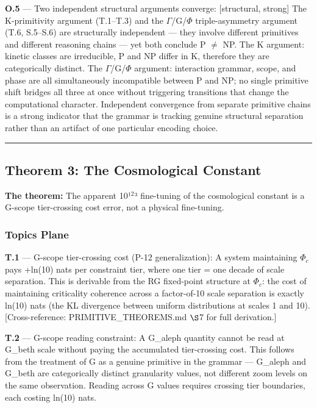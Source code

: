 \documentclass[11pt,a4paper]{article}
\begin{document}
\textbf{O.5} --- Two independent structural arguments converge: {[}structural, strong{]} The K-primitivity argument (T.1--T.3) and the $\Gamma$/G/$\Phi$ triple-asymmetry argument (T.6, S.5--S.6) are structurally independent --- they involve different primitives and different reasoning chains --- yet both conclude P $\neq$ NP. The K argument: kinetic classes are irreducible, P and NP differ in K, therefore they are categorically distinct. The $\Gamma$/G/$\Phi$ argument: interaction grammar, scope, and phase are all simultaneously incompatible between P and NP; no single primitive shift bridges all three at once without triggering transitions that change the computational character. Independent convergence from separate primitive chains is a strong indicator that the grammar is tracking genuine structural separation rather than an artifact of one particular encoding choice.

\begin{center}
\rule{0.5\textwidth}{0.4pt}
\end{center}

\subsection{Theorem 3: The Cosmological Constant}

\textbf{The theorem:} The apparent 10¹$^{2}$³ fine-tuning of the cosmological constant is a G-scope tier-crossing cost error, not a physical fine-tuning.

\subsubsection{Topics Plane}

\textbf{T.1} --- G-scope tier-crossing cost (P-12 generalization): A system maintaining $\Phi_c$ pays +ln(10) nats per constraint tier, where one tier = one decade of scale separation. This is derivable from the RG fixed-point structure at $\Phi_c$: the cost of maintaining criticality coherence across a factor-of-10 scale separation is exactly ln(10) nats (the KL divergence between uniform distributions at scales 1 and 10). {[}Cross-reference: PRIMITIVE\_THEOREMS.md $\S$7 for full derivation.{]}

\textbf{T.2} --- G-scope reading constraint: A G\_aleph quantity cannot be read at G\_beth scale without paying the accumulated tier-crossing cost. This follows from the treatment of G as a genuine primitive in the grammar --- G\_aleph and G\_beth are categorically distinct granularity values, not different zoom levels on the same observation. Reading across G values requires crossing tier boundaries, each costing ln(10) nats.
\end{document}
